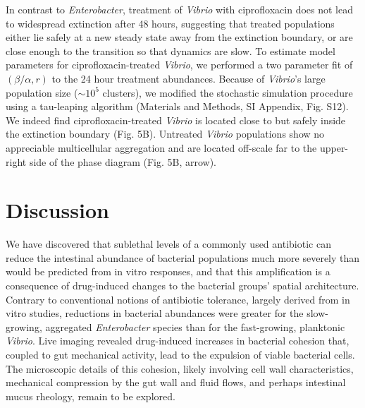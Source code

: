 In contrast to \textit{Enterobacter}, treatment of \textit{Vibrio} with ciprofloxacin does not lead to widespread extinction after 48 hours, suggesting that treated populations either lie safely at a new steady state away from the extinction boundary, or are close enough to the transition so that dynamics are slow. To estimate model parameters for ciprofloxacin-treated \textit{Vibrio}, we performed a two parameter fit of $(\beta/\alpha, r)$ to the 24 hour treatment abundances. Because of \textit{Vibrio}'s large population size ($\sim 10^5$ clusters), we modified the stochastic simulation procedure using a tau-leaping algorithm (Materials and Methods, SI Appendix, Fig. S12). We indeed find ciprofloxacin-treated \textit{Vibrio} is located close to but safely inside the extinction boundary (Fig. 5B). Untreated \textit{Vibrio} populations show no appreciable multicellular aggregation and are located off-scale far to the upper-right side of the phase diagram (Fig. 5B, arrow).  



\section*{Discussion}

We have discovered that sublethal levels of a commonly used antibiotic can reduce the intestinal abundance of bacterial populations much more severely than would be predicted from in vitro responses, and that this amplification is a consequence of drug-induced changes to the bacterial groups' spatial architecture. Contrary to conventional notions of antibiotic tolerance, largely derived from in vitro studies, reductions in bacterial abundances were greater for the slow-growing, aggregated \textit{Enterobacter} species than for the fast-growing, planktonic \textit{Vibrio}. Live imaging revealed drug-induced increases in bacterial cohesion that, coupled to gut mechanical activity, lead to the expulsion of viable bacterial cells. The microscopic details of this cohesion, likely involving cell wall characteristics, mechanical compression by the gut wall and fluid flows, and perhaps intestinal mucus rheology, remain to be explored.

